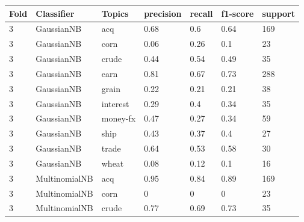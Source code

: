 \documentclass{article}
\begin{document}
\begin{table}[h]
\begin{tabular}{lllllll}
\textbf{Fold} & \textbf{Classifier}    & \textbf{Topics} & \textbf{precision} & \textbf{recall} & \textbf{f1-score} & \textbf{support} \\ \hline
3             & GaussianNB             & acq             & 0.68               & 0.6             & 0.64              & 169              \\
3             & GaussianNB             & corn            & 0.06               & 0.26            & 0.1               & 23               \\
3             & GaussianNB             & crude           & 0.44               & 0.54            & 0.49              & 35               \\
3             & GaussianNB             & earn            & 0.81               & 0.67            & 0.73              & 288              \\
3             & GaussianNB             & grain           & 0.22               & 0.21            & 0.21              & 38               \\
3             & GaussianNB             & interest        & 0.29               & 0.4             & 0.34              & 35               \\
3             & GaussianNB             & money-fx        & 0.47               & 0.27            & 0.34              & 59               \\
3             & GaussianNB             & ship            & 0.43               & 0.37            & 0.4               & 27               \\
3             & GaussianNB             & trade           & 0.64               & 0.53            & 0.58              & 30               \\
3             & GaussianNB             & wheat           & 0.08               & 0.12            & 0.1               & 16               \\
3             & MultinomialNB          & acq             & 0.95               & 0.84            & 0.89              & 169              \\
3             & MultinomialNB          & corn            & 0                  & 0               & 0                 & 23               \\
3             & MultinomialNB          & crude           & 0.77               & 0.69            & 0.73              & 35               \\

\end{tabular}
\end{table}
\end{document}
